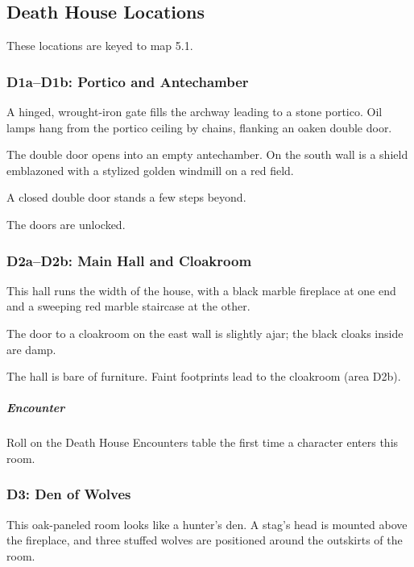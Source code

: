 \documentclass[10pt,a4paper,twoside,bg=print,twocolumn,openany,nodeprecatedcode]{dndbook}
\begin{document}
\subsection{Death House Locations}
These locations are keyed to map 5.1.

\subsubsection{D1a–D1b: Portico and Antechamber}
\begin{DndReadAloud}{}
A hinged, wrought-iron gate fills the archway leading to a stone portico. Oil lamps hang from the portico ceiling by chains, flanking an oaken double door.

The double door opens into an empty antechamber. On the south wall is a shield emblazoned with a stylized golden windmill on a red field.

A closed double door stands a few steps beyond.

\end{DndReadAloud}

The doors are unlocked.

\subsubsection{D2a–D2b: Main Hall and Cloakroom}
\begin{DndReadAloud}{}
This hall runs the width of the house, with a black marble fireplace at one end and a sweeping red marble staircase at the other.

The door to a cloakroom on the east wall is slightly ajar; the black cloaks inside are damp.

\end{DndReadAloud}

The hall is bare of furniture. Faint footprints lead to the cloakroom (area D2b).

\subparagraph{Encounter}
Roll on the Death House Encounters table the first time a character enters this room.

\subsubsection{D3: Den of Wolves}
\begin{DndReadAloud}{}
This oak-paneled room looks like a hunter's den. A stag's head is mounted above the fireplace, and three stuffed wolves are positioned around the outskirts of the room.

\end{DndReadAloud}
\end{document}

